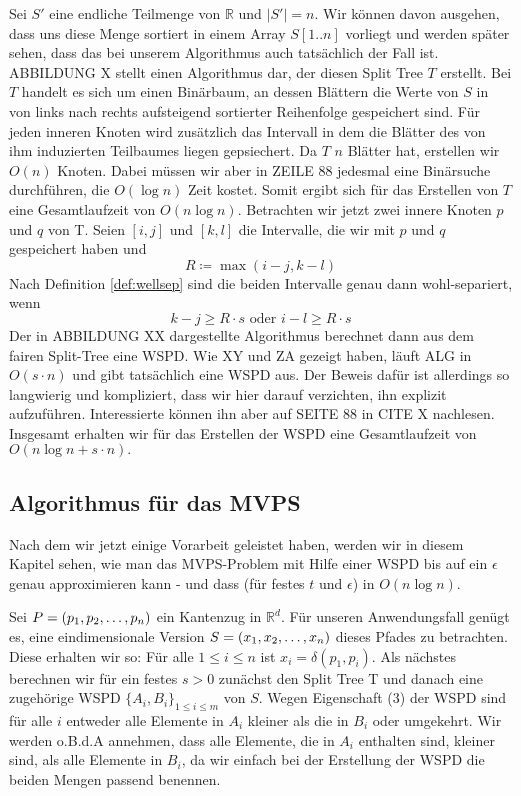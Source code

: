 \documentclass[11pt]{article}
\newcommand{\R}{\mathbb{R}}
\begin{document}
	Sei $S'$ eine endliche Teilmenge von $\R$ und $|S'| = n$. Wir können davon ausgehen, dass uns diese Menge sortiert in einem Array $S[1..n]$ vorliegt und werden später sehen, dass das bei unserem Algorithmus auch tatsächlich der Fall ist. ABBILDUNG X stellt einen Algorithmus dar, der diesen Split Tree $T$ erstellt. Bei $T$ handelt es sich um einen Binärbaum, an dessen Blättern die Werte von $S$ in von links nach rechts aufsteigend sortierter Reihenfolge gespeichert sind. Für jeden inneren Knoten wird zusätzlich das Intervall in dem die Blätter des von ihm induzierten Teilbaumes liegen gepsiechert.
	Da $T$ $n$ Blätter hat, erstellen wir $O(n)$ Knoten. Dabei müssen wir aber in ZEILE 88 jedesmal eine Binärsuche durchführen, die $O(\log n)$ Zeit kostet. Somit ergibt sich für das Erstellen von $T$ eine Gesamtlaufzeit von $O(n\log n)$.
	Betrachten wir jetzt zwei innere Knoten $p$ und $q$ von T. Seien $[i, j]$ und $[k, l]$ die Intervalle, die wir mit $p$ und $q$ gespeichert haben und 
	\[R \coloneqq \max(i - j, k - l)\]
	Nach Definition \ref{def:wellsep} sind die beiden Intervalle genau dann wohl-separiert, wenn 
	\[k - j \geq R \cdot s \text{ oder } i - l \geq R \cdot s \]
	Der in ABBILDUNG XX dargestellte Algorithmus berechnet dann aus dem fairen Split-Tree eine WSPD. Wie XY und ZA gezeigt haben, läuft ALG in $O(s\cdot n)$ und gibt tatsächlich eine WSPD aus. Der Beweis dafür ist allerdings so langwierig und kompliziert, dass wir hier darauf verzichten, ihn explizit aufzuführen. Interessierte können ihn aber auf SEITE 88 in CITE X nachlesen. Insgesamt erhalten wir für das Erstellen der WSPD eine Gesamtlaufzeit von $O(n\log n + s\cdot n).$
    \subsection{Algorithmus für das MVPS}
    \label{subsec:mvps}
    Nach dem wir jetzt einige Vorarbeit geleistet haben, werden wir in diesem Kapitel sehen, wie man das MVPS-Problem mit Hilfe einer WSPD bis auf ein $\epsilon$ genau approximieren kann - und dass (für festes $t$ und $\epsilon$) in $O(n\log n)$.
    
    Sei $P = (p_1, p_2, \mathellipsis, p_n)$ ein Kantenzug in $\R^d$. Für unseren Anwendungsfall genügt es, eine eindimensionale Version $S = (x_1, x_2, \mathellipsis, x_n)$ dieses Pfades zu betrachten. Diese erhalten wir so: Für alle $1 \leq i \leq n$ ist $x_i = \delta(p_1, p_i)$.
    Als nächstes berechnen wir für ein festes $s > 0$ zunächst den Split Tree T und danach eine zugehörige WSPD $\{A_i, B_i\}_{1 \leq i \leq m}$ von $S$. Wegen Eigenschaft (3) der WSPD sind für alle $i$ entweder alle Elemente in $A_i$ kleiner als die in $B_i$ oder umgekehrt. Wir werden o.B.d.A annehmen, dass alle Elemente, die in $A_i$ enthalten sind, kleiner sind, als alle Elemente in $B_i$, da wir einfach bei der Erstellung der WSPD die beiden Mengen passend benennen.
    
\end{document}
